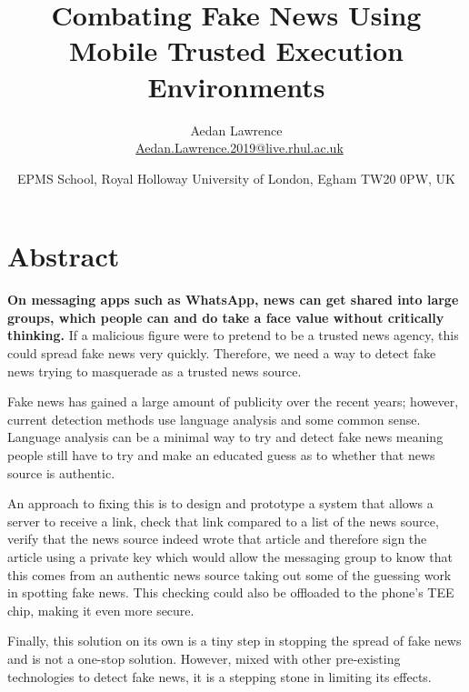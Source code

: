 \documentclass[11pt,a4paper]{report}
\author{Aedan Lawrence \\\ \href{mailto:Aedan.Lawrence.2019@live.rhul.ac.uk}{Aedan.Lawrence.2019@live.rhul.ac.uk}}
\title{Combating Fake News Using Mobile Trusted Execution Environments}
\date{EPMS School, Royal Holloway University of London, Egham TW20 0PW, UK}
\begin{document}
\maketitle
\tableofcontents
\newpage
\section{Abstract}
\textbf{On messaging apps such as WhatsApp, news can get shared into large groups, which people can and do take a face value without critically thinking.} If a malicious figure were to pretend to be a trusted news agency, this could spread fake news very quickly. Therefore, we need a way to detect fake news trying to masquerade as a trusted news source.

Fake news has gained a large amount of publicity over the recent years; however, current detection methods use language analysis and some common sense. Language analysis can be a minimal way to try and detect fake news meaning people still have to try and make an educated guess as to whether that news source is authentic.

An approach to fixing this is to design and prototype a system that allows a server to receive a link, check that link compared to a list of the news source, verify that the news source indeed wrote that article and therefore sign the article using a private key which would allow the messaging group to know that this comes from an authentic news source taking out some of the guessing work in spotting fake news. This checking could also be offloaded to the phone’s TEE chip, making it even more secure.

Finally, this solution on its own is a tiny step in stopping the spread of fake news and is not a one-stop solution. However, mixed with other pre-existing technologies to detect fake news, it is a stepping stone in limiting its effects.
\newpage
\end{document}
